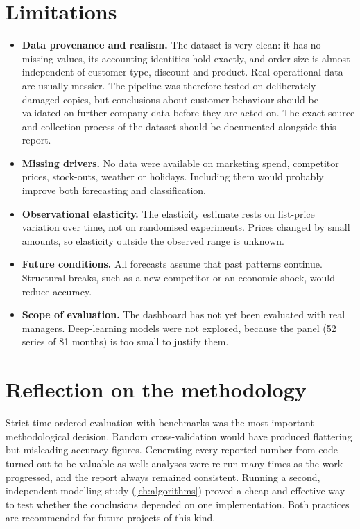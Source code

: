\section{Limitations}\label{sec:limitations}
\begin{itemize}
  \item \textbf{Data provenance and realism.} The dataset is very clean: it has no missing values, its
        accounting identities hold exactly, and order size is almost independent of customer type, discount and
        product. Real operational data are usually messier. The pipeline was therefore tested on deliberately
        damaged copies, but conclusions about customer behaviour should be validated on further company data
        before they are acted on. The exact source and collection process of the dataset should be documented
        alongside this report.
  \item \textbf{Missing drivers.} No data were available on marketing spend, competitor prices, stock-outs,
        weather or holidays. Including them would probably improve both forecasting and classification.
  \item \textbf{Observational elasticity.} The elasticity estimate rests on list-price variation over time, not
        on randomised experiments. Prices changed by small amounts, so elasticity outside the observed range is
        unknown.
  \item \textbf{Future conditions.} All forecasts assume that past patterns continue. Structural breaks, such as
        a new competitor or an economic shock, would reduce accuracy.
  \item \textbf{Scope of evaluation.} The dashboard has not yet been evaluated with real managers. Deep-learning
        models were not explored, because the panel (52 series of 81 months) is too small to justify them.
\end{itemize}

\section{Reflection on the methodology}
Strict time-ordered evaluation with benchmarks was the most important methodological decision. Random
cross-validation would have produced flattering but misleading accuracy figures. Generating every reported
number from code turned out to be valuable as well: analyses were re-run many times as the work progressed, and
the report always remained consistent. Running a second, independent modelling study (\cref{ch:algorithms})
proved a cheap and effective way to test whether the conclusions depended on one implementation. Both practices
are recommended for future projects of this kind.
